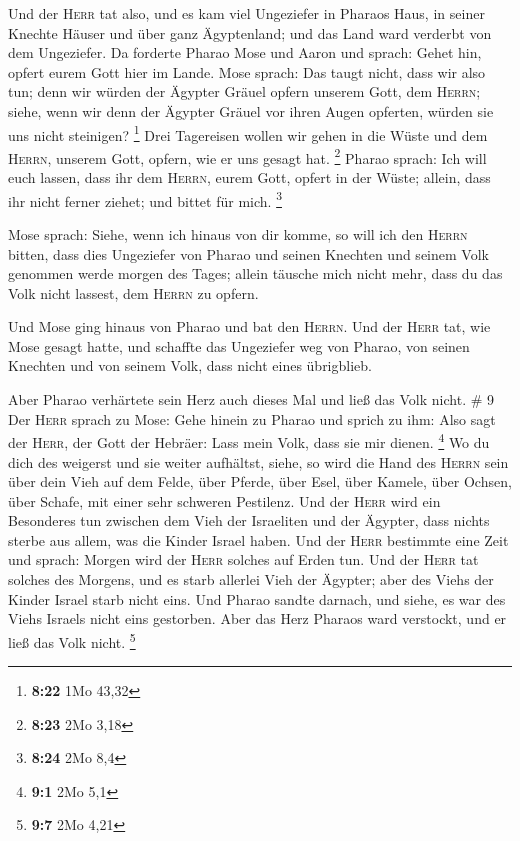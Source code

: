  Und der \textsc{Herr} tat also, und es kam viel
Ungeziefer in Pharaos Haus, in seiner Knechte Häuser und über ganz
Ägyptenland; und das Land ward verderbt von dem Ungeziefer.
 Da forderte Pharao Mose und Aaron und sprach: Gehet hin,
opfert eurem Gott hier im Lande.  Mose sprach: Das taugt
nicht, dass wir also tun; denn wir würden der Ägypter Gräuel opfern
unserem Gott, dem \textsc{Herrn}; siehe, wenn wir denn der Ägypter
Gräuel vor ihren Augen opferten, würden sie uns nicht steinigen?
\footnote{\textbf{8:22} 1Mo 43,32}  Drei Tagereisen
wollen wir gehen in die Wüste und dem \textsc{Herrn}, unserem Gott,
opfern, wie er uns gesagt hat. \footnote{\textbf{8:23} 2Mo 3,18}
 Pharao sprach: Ich will euch lassen, dass ihr dem
\textsc{Herrn}, eurem Gott, opfert in der Wüste; allein, dass ihr nicht
ferner ziehet; und bittet für mich. \footnote{\textbf{8:24} 2Mo 8,4}

 Mose sprach: Siehe, wenn ich hinaus von dir komme, so
will ich den \textsc{Herrn} bitten, dass dies Ungeziefer von Pharao und
seinen Knechten und seinem Volk genommen werde morgen des Tages; allein
täusche mich nicht mehr, dass du das Volk nicht lassest, dem
\textsc{Herrn} zu opfern.

 Und Mose ging hinaus von Pharao und bat den
\textsc{Herrn}.  Und der \textsc{Herr} tat, wie Mose
gesagt hatte, und schaffte das Ungeziefer weg von Pharao, von seinen
Knechten und von seinem Volk, dass nicht eines übrigblieb.

 Aber Pharao verhärtete sein Herz auch dieses Mal und
ließ das Volk nicht. \# 9  Der \textsc{Herr} sprach zu
Mose: Gehe hinein zu Pharao und sprich zu ihm: Also sagt der
\textsc{Herr}, der Gott der Hebräer: Lass mein Volk, dass sie mir
dienen. \footnote{\textbf{9:1} 2Mo 5,1}  Wo du dich des
weigerst und sie weiter aufhältst,  siehe, so wird die
Hand des \textsc{Herrn} sein über dein Vieh auf dem Felde, über Pferde,
über Esel, über Kamele, über Ochsen, über Schafe, mit einer sehr
schweren Pestilenz.  Und der \textsc{Herr} wird ein
Besonderes tun zwischen dem Vieh der Israeliten und der Ägypter, dass
nichts sterbe aus allem, was die Kinder Israel haben.  Und
der \textsc{Herr} bestimmte eine Zeit und sprach: Morgen wird der
\textsc{Herr} solches auf Erden tun.  Und der
\textsc{Herr} tat solches des Morgens, und es starb allerlei Vieh der
Ägypter; aber des Viehs der Kinder Israel starb nicht eins.
 Und Pharao sandte darnach, und siehe, es war des Viehs
Israels nicht eins gestorben. Aber das Herz Pharaos ward verstockt, und
er ließ das Volk nicht. \footnote{\textbf{9:7} 2Mo 4,21}

